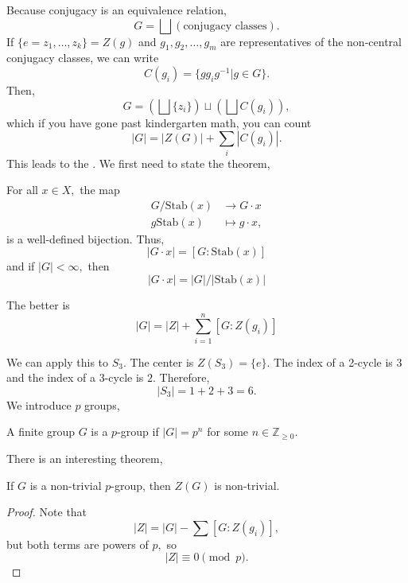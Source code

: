 \documentclass{article}
\numberwithin{equation}{section}
\begin{document}
Because conjugacy is an equivalence relation,
\begin{equation*}
    G = \bigsqcup (\text{conjugacy classes}).
\end{equation*}
If $\{e=z_1,\dots,z_k\} = Z(g)$ and $g_1,g_2,\dots,g_m$ are representatives of the non-central conjugacy classes, we can write 
\begin{equation*}
    C(g_i) = \{gg_ig^{-1}|g\in G\}.
\end{equation*}
Then,
\begin{equation*}
    G =\left(\bigsqcup \{z_i\}\right) \sqcup \left(\bigsqcup C(g_i)\right),
\end{equation*}
which if you have gone past kindergarten math, you can count
\begin{equation*}
    |G| = |Z(G)| + \sum_i |C(g_i)|.
\end{equation*}
This leads to the . We first need to state the  theorem,
\begin{theorem}
    For all $x\in X,$ the map 
    \begin{align*}
        G/\text{Stab}(x) &\to G \cdot x \\ 
        g\text{Stab}(x) &\mapsto g\cdot x,
    \end{align*}
    is a well-defined bijection. Thus,
    \begin{equation*}
        |G\cdot x| = [G:\text{Stab}(x)]
    \end{equation*}
    and if $|G|<\infty,$ then 
    \begin{equation*}
        |G\cdot x| = |G|/|\text{Stab}(x)|
    \end{equation*}
\end{theorem}
\begin{theorem}
    The better  is 
    \begin{equation*}
        |G| = |Z| + \sum_{i=1}^n [G:Z(g_i)]
    \end{equation*}
\end{theorem}
We can apply this to $S_3.$ The center is $Z(S_3)=\{e\}.$ The index of a 2-cycle is $3$ and the index of a 3-cycle is $2.$ Therefore,
\begin{equation*}
    |S_3| = 1 + 2 + 3 = 6.
\end{equation*}
We introduce $p$ groups,
\begin{definition}
    A finite group $G$ is a $p$-group if $|G|=p^n$ for some $n\in \mathbb{Z}_{\ge 0}.$
\end{definition}
There is an interesting theorem,
\begin{theorem}
    If $G$ is a non-trivial $p$-group, then $Z(G)$ is non-trivial.
\end{theorem}
\begin{proof}
    Note that 
    \begin{equation*}
        |Z| = |G| - \sum [G:Z(g_i)],
    \end{equation*}
    but both terms are powers of $p,$ so 
    \begin{equation*}
        |Z| \equiv 0 \pmod{p}.
    \end{equation*}
\end{proof}
\end{document}
